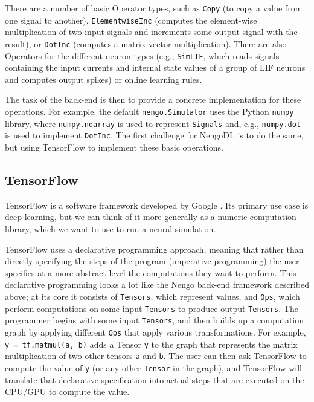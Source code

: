 \documentclass{article}
\begin{document}
There are a number of basic Operator types, such as \texttt{Copy} (to copy a value from one signal to another), \texttt{ElementwiseInc} (computes the element-wise multiplication of two input signals and increments some output signal with the result), or \texttt{DotInc} (computes a matrix-vector multiplication).  There are also Operators for the different neuron types (e.g., \texttt{SimLIF}, which reads signals containing the input currents and internal state values of a group of LIF neurons and computes output spikes) or online learning rules.

The task of the back-end is then to provide a concrete implementation for these operations.  For example, the default \texttt{nengo.Simulator} uses the Python \texttt{numpy} library, where \texttt{numpy.ndarray} is used to represent \texttt{Signals} and, e.g., \texttt{numpy.dot} is used to implement \texttt{DotInc}.  The first challenge for NengoDL is to do the same, but using TensorFlow to implement these basic operations.

\subsection{TensorFlow}

TensorFlow is a software framework developed by Google \citep{Abadi2016}.  Its primary use case is deep learning, but we can think of it more generally as a numeric computation library, which we want to use to run a neural simulation.

TensorFlow uses a declarative programming approach, meaning that rather than directly specifying the steps of the program (imperative programming) the user specifies at a more abstract level the computations they want to perform.  This declarative programming looks a lot like the Nengo back-end framework described above; at its core it consists of \texttt{Tensors}, which represent values, and \texttt{Ops}, which perform computations on some input \texttt{Tensors} to produce output \texttt{Tensors}. The programmer begins with some input \texttt{Tensors}, and then builds up a computation graph by applying different \texttt{Ops} that apply various transformations.  For example, \texttt{y = tf.matmul(a, b)} adds a Tensor \texttt{y} to the graph that represents the matrix multiplication of two other tensors \texttt{a} and \texttt{b}.  The user can then ask TensorFlow to compute the value of \texttt{y} (or any other \texttt{Tensor} in the graph), and TensorFlow will translate that declarative specification into actual steps that are executed on the CPU/GPU to compute the value.
\end{document}

